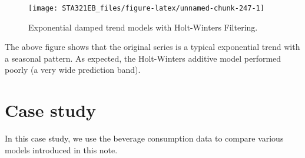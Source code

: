 \documentclass[
]{book}
\begin{document}
\begin{figure}

{\centering \texttt{[image: STA321EB\_files/figure-latex/unnamed-chunk-247-1]} 

}

\caption{Exponential damped trend models with Holt-Winters Filtering.}\label{fig:unnamed-chunk-247}
\end{figure}

The above figure shows that the original series is a typical exponential trend with a seasonal pattern. As expected, the Holt-Winters additive model performed poorly (a very wide prediction band).

\hypertarget{case-study-3}{%
\section{Case study}\label{case-study-3}}

In this case study, we use the beverage consumption data to compare various models introduced in this note.
\end{document}

